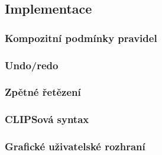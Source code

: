 \subsection{Implementace}






\subsubsection{Kompozitní podmínky pravidel}
\subsubsection{Undo/redo}
\subsubsection{Zpětné řetězení}
\subsubsection{CLIPSová syntax}
\subsubsection{Grafické uživatelské rozhraní}
